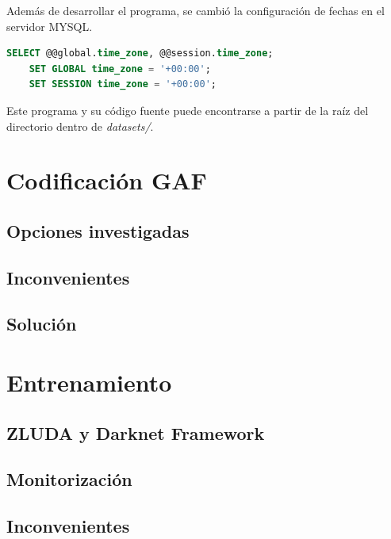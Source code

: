 Además de desarrollar el programa, se cambió la configuración de fechas en el servidor MYSQL. 

\begin{lstlisting}[language=SQL,frame=ltrb,framesep=5pt,basicstyle=\normalsize,basicstyle=\ttfamily]
    SELECT @@global.time_zone, @@session.time_zone;
    SET GLOBAL time_zone = '+00:00';
    SET SESSION time_zone = '+00:00';
\end{lstlisting}

Este programa y su código fuente puede encontrarse a partir de la raíz del directorio dentro de \textit{datasets/}.

\section{Codificación GAF}

\subsection{Opciones investigadas}
\subsection{Inconvenientes}
\subsection{Solución}


\section{Entrenamiento}
\subsection{ZLUDA y Darknet Framework}
\subsection{Monitorización}
\subsection{Inconvenientes}
